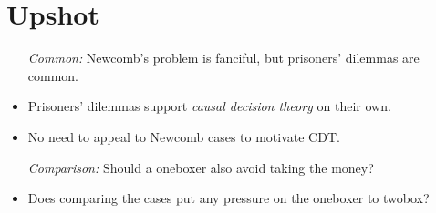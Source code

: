 \documentclass[a4paper, 11pt]{article} %
\begin{document}
\section*{Upshot}

\begin{itemize}
  \item[\it Common:] Newcomb's problem is fanciful, but prisoners' dilemmas are common.
    \item Prisoners' dilemmas support \textit{causal decision theory} on their own.
    \item No need to appeal to Newcomb cases to motivate CDT.
  \item[\it Comparison:] Should a oneboxer also avoid taking the money?
    \item Does comparing the cases put any pressure on the oneboxer to twobox?
\end{itemize}
\end{document}
